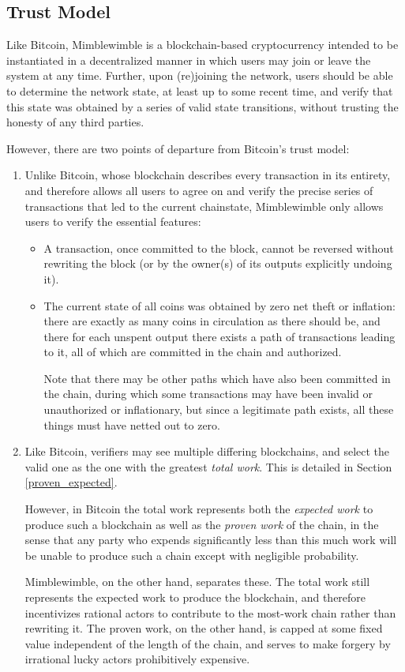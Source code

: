 \documentclass[letterpaper]{article}
\begin{document}
\subsection{Trust Model\label{sec:trust}}

Like Bitcoin, Mimblewimble is a blockchain-based cryptocurrency intended
to be instantiated in a decentralized manner in which users may join or
leave the system at any time. Further, upon (re)joining the network, users
should be able to determine the network state, at least up to some recent
time, and verify that this state was obtained by a series of valid state
transitions, without trusting the honesty of any third parties.

However, there are two points of departure from Bitcoin's trust model:
\begin{enumerate}
\item Unlike Bitcoin, whose blockchain describes every transaction in its
entirety, and therefore allows all users to agree on and verify the precise
series of transactions that led to the current chainstate, Mimblewimble
only allows users to verify the essential features:
\begin{itemize}
\item A transaction, once committed to the block, cannot be reversed
without rewriting the block (or by the owner(s) of its outputs explicitly
undoing it).
\item The current state of all coins was obtained by zero net theft or
inflation: there are exactly as many coins in circulation as there should
be, and there for each unspent output there exists a path of transactions
leading to it, all of which are committed in the chain and authorized.

Note that there may be other paths which have also been committed in the
chain, during which some transactions may have been invalid or unauthorized
or inflationary, but since a legitimate path exists, all these things must
have netted out to zero.
\end{itemize}

\item Like Bitcoin, verifiers may see multiple differing blockchains, and
select the valid one as the one with the greatest \emph{total work}. This
is detailed in Section \ref{proven_expected}.

However, in Bitcoin the total work represents both the \emph{expected work}
to produce such a blockchain as well as the \emph{proven work} of the chain,
in the sense that any party who expends significantly less than this much work
will be unable to produce such a chain except with negligible probability.

Mimblewimble, on the other hand, separates these. The total work still
represents the expected work to produce the blockchain, and therefore
incentivizes rational actors to contribute to the most-work chain rather
than rewriting it. The proven work, on the other hand, is capped at some
fixed value independent of the length of the chain, and serves to make
forgery by irrational lucky actors prohibitively expensive.
\end{enumerate}
\end{document}

